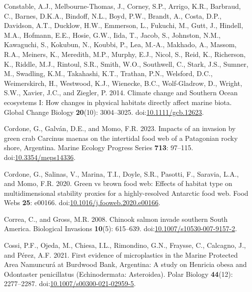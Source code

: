 \documentclass[
]{article}
\newlength{\cslhangindent}
\newenvironment{CSLReferences}[2] %
 {\begin{list}{}{%
  \setlength{\itemindent}{0pt}
  \setlength{\leftmargin}{0pt}
  \setlength{\parsep}{0pt}
  \ifodd #1
   \setlength{\leftmargin}{\cslhangindent}
   \setlength{\itemindent}{-1\cslhangindent}
  \fi
  \setlength{\itemsep}{#2\baselineskip}}}
 {\end{list}}
\begin{document}
\begin{CSLReferences}{1}{0}
Constable, A.J., Melbourne-Thomas, J., Corney, S.P., Arrigo, K.R.,
Barbraud, C., Barnes, D.K.A., Bindoff, N.L., Boyd, P.W., Brandt, A.,
Costa, D.P., Davidson, A.T., Ducklow, H.W., Emmerson, L., Fukuchi, M.,
Gutt, J., Hindell, M.A., Hofmann, E.E., Hosie, G.W., Iida, T., Jacob,
S., Johnston, N.M., Kawaguchi, S., Kokubun, N., Koubbi, P., Lea, M.-A.,
Makhado, A., Massom, R.A., Meiners, K., Meredith, M.P., Murphy, E.J.,
Nicol, S., Reid, K., Richerson, K., Riddle, M.J., Rintoul, S.R., Smith,
W.O., Southwell, C., Stark, J.S., Sumner, M., Swadling, K.M., Takahashi,
K.T., Trathan, P.N., Welsford, D.C., Weimerskirch, H., Westwood, K.J.,
Wienecke, B.C., Wolf-Gladrow, D., Wright, S.W., Xavier, J.C., and
Ziegler, P. 2014. Climate change and {Southern Ocean} ecosystems {I}:
How changes in physical habitats directly affect marine biota. Global
Change Biology \textbf{20}(10): 3004--3025.
doi:\href{https://doi.org/10.1111/gcb.12623}{10.1111/gcb.12623}.

Cordone, G., Galván, D.E., and Momo, F.R. 2023. Impacts of an invasion
by green crab {Carcinus} maenas on the intertidal food web of a
{Patagonian} rocky shore, {Argentina}. Marine Ecology Progress Series
\textbf{713}: 97--115.
doi:\href{https://doi.org/10.3354/meps14336}{10.3354/meps14336}.

Cordone, G., Salinas, V., Marina, T.I., Doyle, S.R., Pasotti, F.,
Saravia, L.A., and Momo, F.R. 2020. Green vs brown food web: {Effects}
of habitat type on multidimensional stability proxies for a
highly-resolved {Antarctic} food web. Food Webs \textbf{25}: e00166.
doi:\href{https://doi.org/10.1016/j.fooweb.2020.e00166}{10.1016/j.fooweb.2020.e00166}.

Correa, C., and Gross, M.R. 2008. Chinook salmon invade southern {South
America}. Biological Invasions \textbf{10}(5): 615--639.
doi:\href{https://doi.org/10.1007/s10530-007-9157-2}{10.1007/s10530-007-9157-2}.

Cossi, P.F., Ojeda, M., Chiesa, I.L., Rimondino, G.N., Fraysse, C.,
Calcagno, J., and Pérez, A.F. 2021. First evidence of microplastics in
the {Marine Protected Area Namuncur{á}} at {Burdwood Bank}, {Argentina}:
A study on {Henricia} obesa and {Odontaster} penicillatus
({Echinodermata}: {Asteroidea}). Polar Biology \textbf{44}(12):
2277--2287.
doi:\href{https://doi.org/10.1007/s00300-021-02959-5}{10.1007/s00300-021-02959-5}.


\end{CSLReferences}
\end{document}
